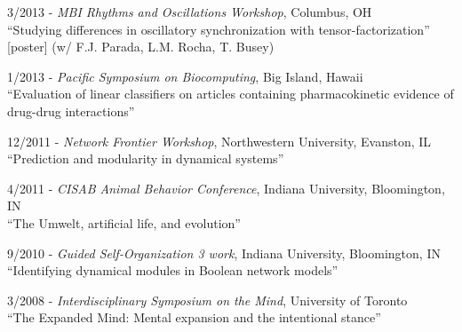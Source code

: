 \documentclass[margin,line,centered]{res}
\begin{document}
\begin{resume}
3/2013 - \emph{MBI Rhythms and Oscillations Workshop}, Columbus, OH\\
``Studying differences in oscillatory synchronization with tensor-factorization'' [poster]
(w/ F.J. Parada, L.M. Rocha, T. Busey)

1/2013 - \emph{Pacific Symposium on Biocomputing}, Big Island, Hawaii\\
``Evaluation of linear classifiers on articles containing pharmacokinetic evidence
 of drug-drug interactions'' %


12/2011 - \emph{Network Frontier Workshop}, Northwestern University, Evanston, IL\\
``Prediction and modularity in dynamical systems''


4/2011 - %
\emph{CISAB Animal Behavior Conference}, Indiana University, Bloomington, IN\\
``The Umwelt, artificial life, and evolution''

9/2010 - \emph{Guided Self-Organization 3 work}, Indiana University, Bloomington, IN\\
``Identifying dynamical modules in Boolean network models''

3/2008 - \emph{Interdisciplinary Symposium on the Mind}, University of Toronto\\
``The Expanded Mind: Mental expansion and the intentional stance''





\end{resume}
\end{document}
